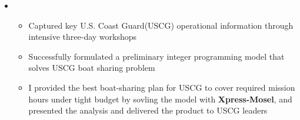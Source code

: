 \documentclass[11pt,a4paper,sans]{moderncv}        %
\begin{document}
\begin{itemize}
	\item{
		{\vspace{3pt}
			\begin{itemize}
				\item Captured key U.S. Coast Guard(USCG) operational information through intensive three-day workshops
				\item Successfully formulated a preliminary integer programming model that solves USCG boat sharing problem
				\item I provided the best boat-sharing plan for USCG to cover required mission hours under tight budget by sovling the model with \textbf{Xpress-Mosel}, and presented the analysis and delivered the product to USCG leaders %
			\end{itemize}}}

	\vspace{4pt}


\end{itemize}
\end{document}
